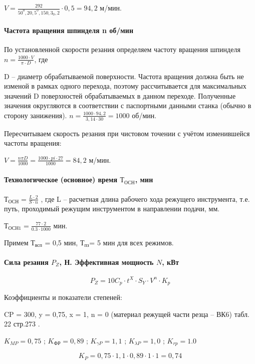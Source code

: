  $ V = \frac{292}{50^0,2 0,5^0,15 0,3_0,2} \cdot 0,5 = 94,2 $ м/мин.

\paragraph{Частота вращения шпинделя n об/мин} По установленной скорости резания определяем частоту вращения шпинделя
$ n = \frac{1000 \cdot V } { \pi \cdot D} $, где

D – диаметр обрабатываемой поверхности. Частота вращения должна быть не изменой в рамках одного перехода, поэтому рассчитывается для максимальных значений D поверхностей обрабатываемых в данном переходе.
Полученные значения округляются в соответствии с паспортными данными станка (обычно в сторону занижения). 
$ n = \frac{1000 \cdot 94,2} { 3,14 \cdot 30} =1000 $ об/мин.

Пересчитываем скорость резания при чистовом точении с учётом изменившейся частоты вращения:

$ V = \frac{n \pi D}{1000} = \frac{1000 \cdot pi \cdot 27} {1000} = 84,2$ м/мин.

\paragraph{Технологическое (основное) время  $Т_\text{ОСН}$, мин}

$Т_\text{ОСН} = \frac{L \cdot 2 } {S \cdot n}$ , где
L – расчетная длина рабочего хода режущего инструмента, т.е. путь, проходимый режущим инструментом в направлении подачи, мм.

$Т_\text{ОСН1} = \frac{77 \cdot 2 } {0.3 \cdot 1000}$ мин.

Примем $Т_\text{всп}$ = 0,5 мин, $Т_\text{пз}$= 5  мин для всех режимов.

\clearpage
\paragraph{Сила резания $P_Z$, Н. Эффективная мощность $N$, кВт}

$$P_Z = 10 C_p \cdot t^X \cdot S_Y \cdot V^n \cdot K_p$$

Коэффициенты и показатели степеней:

CP = 300, y = 0,75, x = 1, n = 0 (материал режущей части резца – ВК6) табл. 22 стр.273 \cite{TECHNO}.

	$K_{MP} = 0,75$ ; $K_\text{ФР} = 0,89$ ; $K_{\gamma P} = 1,1$ ; $K_{\lambda P} = 1,0 $  ; $K_{rp} = 1.0 $

	$$K_P = 0,75 \cdot 1,1 \cdot 0,89 \cdot 1 \cdot 1 = 0,74$$

